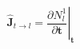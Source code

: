 \begin{equation}
\hat{\mathbf{J}}_{t \to l} = \left. \frac{\partial N_l^1}{\partial \mathbf{t}} \right|_{\mathbf{t}}
\end{equation}
